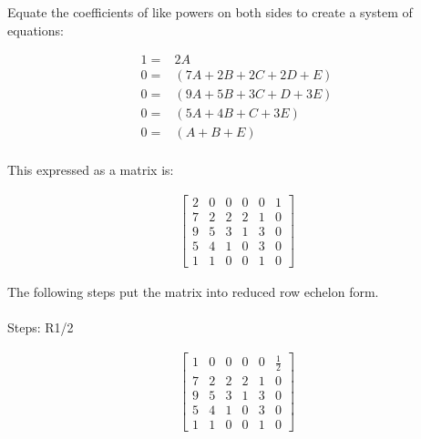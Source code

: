 \documentclass[12pt, letterpaper]{../assignment}
\begin{document}
Equate the coefficients of like powers on both sides to create a system of equations:

\begin{equation*}
    \begin{aligned}
        1 = &2A\\
        0 = &(7A + 2B + 2C + 2D + E) \\
        0 = &(9A + 5B + 3C + D + 3E) \\
        0 = &(5A + 4B + C + 3E) \\
        0 = &(A + B + E) \\
    \end{aligned}
\end{equation*}

This expressed as a matrix is:

\begin{equation*}
    \begin{aligned}
        \left[\begin{array}{ccccc|c} 
            2 & 0 & 0 & 0 & 0 & 1\\
            7 & 2 & 2 & 2 & 1 & 0\\
            9 & 5 & 3 & 1 & 3 & 0\\
            5 & 4 & 1 & 0 & 3 & 0\\
            1 & 1 & 0 & 0 & 1 & 0
        \end{array}\right]
    \end{aligned}
\end{equation*}

The following steps put the matrix into reduced row echelon form.
\\\\

Steps: R1/2

\begin{equation*}
    \begin{aligned}
        \left[\begin{array}{ccccc|c} 
            1 & 0 & 0 & 0 & 0 & \frac{1}{2}\\
            7 & 2 & 2 & 2 & 1 & 0\\
            9 & 5 & 3 & 1 & 3 & 0\\
            5 & 4 & 1 & 0 & 3 & 0\\
            1 & 1 & 0 & 0 & 1 & 0
        \end{array}\right]
    \end{aligned}
\end{equation*}
\end{document}
